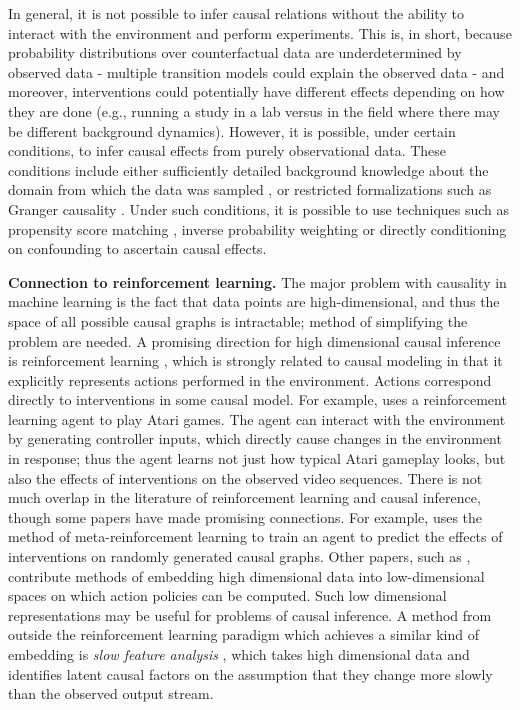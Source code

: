 \documentclass{article}
\begin{document}
In general, it is not possible to infer causal relations without the ability to interact with the environment and perform experiments. This is, in short, because probability distributions over counterfactual data are underdetermined by observed data - multiple transition models could explain the observed data - and moreover, interventions could potentially have different effects depending on how they are done (e.g., running a study in a lab versus in the field where there may be different background dynamics). However, it is possible, under certain conditions, to infer causal effects from purely observational data. These conditions include either sufficiently detailed background knowledge about the domain from which the data was sampled \cite{Pearl2009} \cite{Rosenbaum1983}, or restricted formalizations such as Granger causality \cite{granger1969investigating} \cite{granger1980testing}. Under such conditions, it is possible to use techniques such as propensity score matching \cite{Rosenbaum1983}, inverse probability weighting \cite{seaman2013review} or directly conditioning on confounding to ascertain causal effects.


\textbf{Connection to reinforcement learning.} The major problem with causality in machine learning is the fact that data points are high-dimensional, and thus the space of all possible causal graphs is intractable; method of simplifying the problem are needed. A promising direction for high dimensional causal inference is reinforcement learning \cite{Sutton2018}, which is strongly related to causal modeling in that it explicitly represents actions performed in the environment. Actions correspond directly to interventions in some causal model. For example, \cite{Oh2015} uses a reinforcement learning agent to play Atari games. The agent can interact with the environment by generating controller inputs, which directly cause changes in the environment in response; thus the agent learns not just how typical Atari gameplay looks, but also the effects of interventions on the observed video sequences. There is not much overlap in the literature of reinforcement learning and causal inference, though some papers have made promising connections. For example, \cite{Dasgupta2019} uses the method of meta-reinforcement learning to train an agent to predict the effects of interventions on randomly generated causal graphs. Other papers, such as \cite{Lange2012}, contribute methods of embedding high dimensional data into low-dimensional spaces on which action policies can be computed. Such low dimensional representations may be useful for problems of causal inference. A method from outside the reinforcement learning paradigm which achieves a similar kind of embedding is \emph{slow feature analysis} \cite{kompella2011incremental}, which takes high dimensional data and identifies latent causal factors on the assumption that they change more slowly than the observed output stream.
\end{document}
